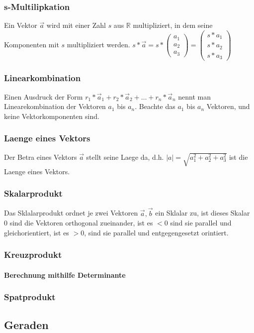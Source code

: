 \documentclass[a4paper]{article} %
\begin{document}
	\subsubsection{s-Multilipkation}
	Ein Vektor $\vec{a}$ wird mit einer Zahl $s$ aus $\mathbb{R}$ multipliziert, in dem seine Komponenten mit $s$ multipliziert werden.
	$s*\vec{a}=s*\begin{pmatrix}a_1\\a_2\\a_3\end{pmatrix}=\begin{pmatrix}s*a_1\\s*a_2\\s*a_3\end{pmatrix}$
	\subsubsection{Linearkombination}
	Einen Ausdruck der Form $r_1*\vec{a}_1 + r_2*\vec{a}_2 + \hdots + r_n*\vec{a}_n $ nennt man Linearekombination der Vektoren $a_1$ bis $a_n$.
	Beachte das $a_1$ bis $a_n$ Vektoren, und keine Vektorkomponenten sind.
	\subsubsection{Laenge eines Vektors}
	Der Betra eines Vektors $\vec{a}$ stellt seine Laege da, d.h. $|a|=\sqrt{a_1^2+a_2^2+a_3^2}$ ist die Laenge eines Vektors.
	\subsubsection{Skalarprodukt}
	Das Sklalarprodukt ordnet je zwei Vektoren $\vec{a},\vec{b}$ ein Sklalar zu, ist dieses Skalar $0$ sind die Vektoren orthogonal zueinander, ist es $< 0$ sind sie parallel und gleichorientiert, ist es $> 0$, sind sie parallel und entgegengesetzt orintiert.
	\subsubsection{Kreuzprodukt}
	\paragraph{Berechnung mithilfe Determinante}
	\subsubsection{Spatprodukt}
	\subsection{Geraden}
\end{document}
